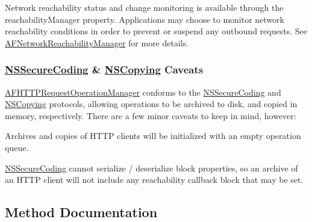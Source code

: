 Network reachability status and change monitoring is available through the {\ttfamily reachability\+Manager} property. Applications may choose to monitor network reachability conditions in order to prevent or suspend any outbound requests. See {\ttfamily \mbox{\hyperlink{interface_a_f_network_reachability_manager}{A\+F\+Network\+Reachability\+Manager}}} for more details.

\subsubsection*{\mbox{\hyperlink{class_n_s_secure_coding-p}{N\+S\+Secure\+Coding}} \& \mbox{\hyperlink{class_n_s_copying-p}{N\+S\+Copying}} Caveats}

{\ttfamily \mbox{\hyperlink{interface_a_f_h_t_t_p_request_operation_manager}{A\+F\+H\+T\+T\+P\+Request\+Operation\+Manager}}} conforms to the {\ttfamily \mbox{\hyperlink{class_n_s_secure_coding-p}{N\+S\+Secure\+Coding}}} and {\ttfamily \mbox{\hyperlink{class_n_s_copying-p}{N\+S\+Copying}}} protocols, allowing operations to be archived to disk, and copied in memory, respectively. There are a few minor caveats to keep in mind, however\+:


\begin{DoxyItemize}
\item Archives and copies of H\+T\+TP clients will be initialized with an empty operation queue.
\item \mbox{\hyperlink{class_n_s_secure_coding-p}{N\+S\+Secure\+Coding}} cannot serialize / deserialize block properties, so an archive of an H\+T\+TP client will not include any reachability callback block that may be set. 
\end{DoxyItemize}

\subsection{Method Documentation}
\mbox{\label{interface_a_f_h_t_t_p_request_operation_manager_a5b264d221dc9185e642e11b86cfc4072}} 

